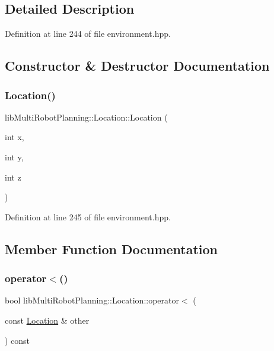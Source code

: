 \subsection{Detailed Description}


Definition at line 244 of file environment.\+hpp.



\subsection{Constructor \& Destructor Documentation}
\mbox{\label{structlib_multi_robot_planning_1_1_location_a575f4c2a0b65829873bee62ab5a5ad96}} 
\subsubsection{\texorpdfstring{Location()}{Location()}}
{\footnotesize\ttfamily lib\+Multi\+Robot\+Planning\+::\+Location\+::\+Location (\begin{DoxyParamCaption}\item[{int}]{x,  }\item[{int}]{y,  }\item[{int}]{z }\end{DoxyParamCaption})\hspace{0.3cm}{\ttfamily [inline]}}



Definition at line 245 of file environment.\+hpp.



\subsection{Member Function Documentation}
\mbox{\label{structlib_multi_robot_planning_1_1_location_abe04a4c39f478d6dbfdbbb12fe70253a}} 
\subsubsection{\texorpdfstring{operator$<$()}{operator<()}}
{\footnotesize\ttfamily bool lib\+Multi\+Robot\+Planning\+::\+Location\+::operator$<$ (\begin{DoxyParamCaption}\item[{const \hyperlink{structlib_multi_robot_planning_1_1_location}{Location} \&}]{other }\end{DoxyParamCaption}) const\hspace{0.3cm}{\ttfamily [inline]}}



